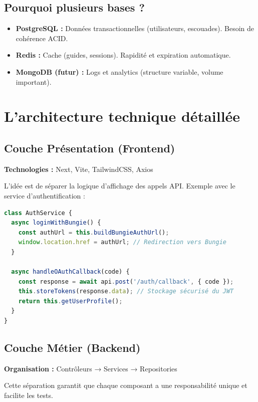 \subsection{Pourquoi plusieurs bases ?}

\begin{itemize}
    \item \textbf{PostgreSQL :} Données transactionnelles (utilisateurs, escouades). Besoin de cohérence ACID.
    \item \textbf{Redis :} Cache (guides, sessions). Rapidité et expiration automatique.
    \item \textbf{MongoDB (futur) :} Logs et analytics (structure variable, volume important).
\end{itemize}

\section{L'architecture technique détaillée}

\subsection{Couche Présentation (Frontend)}

\textbf{Technologies :} Next, Vite, TailwindCSS, Axios

L'idée est de séparer la logique d'affichage des appels API. Exemple avec le service d'authentification :

\begin{lstlisting}[language=JavaScript]
class AuthService {
  async loginWithBungie() {
    const authUrl = this.buildBungieAuthUrl();
    window.location.href = authUrl; // Redirection vers Bungie
  }
  
  async handleOAuthCallback(code) {
    const response = await api.post('/auth/callback', { code });
    this.storeTokens(response.data); // Stockage sécurisé du JWT
    return this.getUserProfile();
  }
}
\end{lstlisting}

\subsection{Couche Métier (Backend)}

\textbf{Organisation :} Contrôleurs → Services → Repositories

Cette séparation garantit que chaque composant a une responsabilité unique et facilite les tests.

